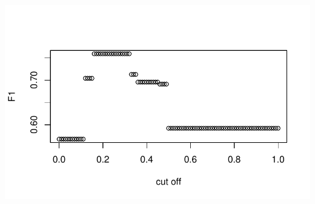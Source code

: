 \documentclass[
  letterpaper,
  DIV=11,
  numbers=noendperiod]{scrartcl}
\begin{document}
\includegraphics{FinalProject_files/figure-pdf/poisson-1.pdf}
\end{document}
